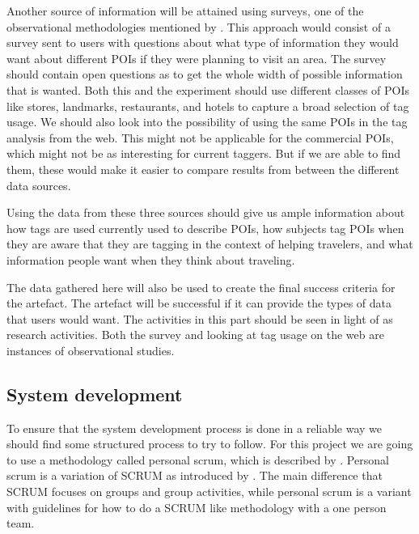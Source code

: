 Another source of information will be attained using surveys, one of the observational methodologies mentioned by \citet{Chen1990}.
This approach would consist of a survey sent to users with questions about what type of information they would want about different POIs if they were planning to visit an area.
The survey should contain open questions as to get the whole width of possible information that is wanted.
Both this and the experiment should use different classes of POIs like stores, landmarks, restaurants, and hotels to capture a broad selection of tag usage. 
We should also look into the possibility of using the same POIs in the tag analysis from the web. 
This might not be applicable for the commercial POIs, which might not be as interesting for current taggers. 
But if we are able to find them, these would make it easier to compare results from between the different data sources.

Using the data from these three sources should give us ample information about how tags are used currently used to describe POIs, 
how subjects tag POIs when they are aware that they are tagging in the context of helping travelers, 
and what information people want when they think about traveling. 

The data gathered here will also be used to create the final success criteria for the artefact. 
The artefact will be successful if it can provide the types of data that users would want. 
The activities in this part should be seen in light of \citet{Chen1990} as research activities. 
Both the survey and looking at tag usage on the web are instances of observational studies.




\subsection{System development}
To ensure that the system development process is done in a reliable way we should find some structured process to try to follow.
For this project we are going to use a methodology called personal scrum, which is described by \citet{Pruitt2011}.
Personal scrum is a variation of SCRUM as introduced by \citet{Schwaber1995}. 
The main difference that SCRUM focuses on groups and group activities, while personal scrum is a variant with guidelines for how to do a SCRUM like methodology with a one person team.

